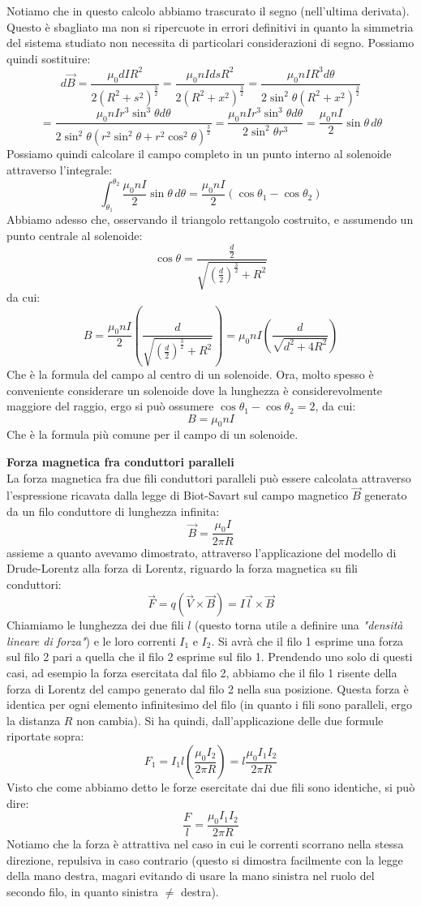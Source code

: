 \documentclass[a4paper,12pt]{article}
\begin{document}
Notiamo che in questo calcolo abbiamo trascurato il segno (nell'ultima derivata). Questo è sbagliato ma non si ripercuote in errori definitivi in quanto la simmetria del sistema studiato non necessita di particolari considerazioni di segno.
Possiamo quindi sostituire:
$$ d\vec{B} = \frac{\mu_0 dI R^2}{2(R^2+s^2)^{\frac{3}{2}}} = \frac{\mu_0 n I ds R^2}{2(R^2+x^2)^{\frac{3}{2}}} = \frac{\mu_0 n I R^3d\theta}{2\sin^2{\theta}(R^2+x^2)^{\frac{3}{2}}} $$
$$ = \frac{\mu_0 n I r^3 \sin^3{\theta}d\theta}{2\sin^2{\theta}(r^2\sin^2{\theta} + r^2\cos^2{\theta})^{\frac{3}{2}}} = \frac{\mu_0 n I r^3 \sin^3{\theta}d\theta}{2\sin^2{\theta}r^3} = \frac{\mu_0 n I}{2}\sin{\theta}\,d\theta $$
Possiamo quindi calcolare il campo completo in un punto interno al solenoide attraverso l'integrale:
$$ \int_{\theta_1}^{\theta_2} \frac{\mu_0 n I}{2}\sin{\theta}\,d\theta = \frac{\mu_0 n I}{2}(\cos{\theta_1} - \cos{\theta_2}) $$
Abbiamo adesso che, osservando il triangolo rettangolo costruito, e assumendo un punto centrale al solenoide:
$$ \cos{\theta} = \frac{\frac{d}{2}}{\sqrt{\left(\frac{d}{2}\right)^{\frac{3}{2}} + R^2}}  $$
da cui:
$$ B = \frac{\mu_0 n I}{2}\left(  \frac{d}{\sqrt{\left(\frac{d}{2}\right)^{\frac{3}{2}} + R^2}} \right) = \mu_0 n I \left( \frac{d}{\sqrt{d^2 + 4R^2}} \right)$$
Che è la formula del campo al centro di un solenoide. Ora, molto spesso è conveniente considerare un solenoide dove la lunghezza è considerevolmente maggiore del raggio, ergo si può ossumere $\cos{\theta_1} - \cos{\theta_2} = 2$, da cui:
$$ B = \mu_0 n I$$
Che è la formula più comune per il campo di un solenoide.
\par\smallskip
\textbf{Forza magnetica fra conduttori paralleli} \\
La forza magnetica fra due fili conduttori paralleli può essere calcolata attraverso l'espressione ricavata dalla legge di Biot-Savart sul campo magnetico $\vec{B}$ generato da un filo conduttore di lunghezza infinita:
$$ \vec{B} = \frac{\mu_0 I}{2\pi R} $$
assieme a quanto avevamo dimostrato, attraverso l'applicazione del modello di Drude-Lorentz alla forza di Lorentz, riguardo la forza magnetica su fili conduttori:
$$ \vec{F} = q(\vec{V} \times \vec{B}) = I\vec{l} \times \vec{B}$$
Chiamiamo le lunghezza dei due fili $l$ (questo torna utile a definire una \textit{"densità lineare di forza"}) e le loro correnti $I_1$ e $I_2$. Si avrà che il filo 1 esprime una forza sul filo 2 pari a quella che il filo 2 esprime sul filo 1. Prendendo uno solo di questi casi,
ad esempio la forza esercitata dal filo 2, abbiamo che il filo 1 risente della forza di Lorentz del campo generato dal filo 2 nella sua posizione. Questa forza è identica per ogni elemento infinitesimo del filo
(in quanto i fili sono paralleli, ergo la distanza $R$ non cambia). Si ha quindi, dall'applicazione delle due formule riportate sopra:
$$ F_1 = I_1l\left(\frac{\mu_0 I_2}{2\pi R}\right) = l \frac{\mu_0 I_1I_2}{2\pi R} $$
Visto che come abbiamo detto le forze esercitate dai due fili sono identiche, si può dire:
$$ \frac{F}{l} = \frac{\mu_0 I_1I_2}{2\pi R} $$
Notiamo che la forza è attrattiva nel caso in cui le correnti scorrano nella stessa direzione, repulsiva in caso contrario (questo si dimostra facilmente con la legge della mano destra, magari evitando di usare la mano sinistra
nel ruolo del secondo filo, in quanto sinistra $\neq$ destra).
\end{document}
